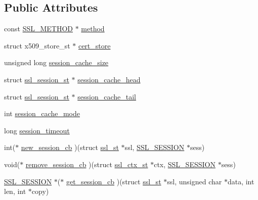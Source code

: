 \subsection*{Public Attributes}
\begin{DoxyCompactItemize}
\item 
const \hyperlink{ssl_8h_a74d54b9a714accac31c73bfb55973e81}{S\-S\-L\-\_\-\-M\-E\-T\-H\-O\-D} $\ast$ \hyperlink{structssl__ctx__st_a9e4773d3ec5b1a80abab92390015c576}{method}
\item 
struct x509\-\_\-store\-\_\-st $\ast$ \hyperlink{structssl__ctx__st_a8b6658b3bc3acb20908f2541056e3949}{cert\-\_\-store}
\item 
unsigned long \hyperlink{structssl__ctx__st_af715c6f8caa8c192423ad5abfa211e6e}{session\-\_\-cache\-\_\-size}
\item 
struct \hyperlink{structssl__session__st}{ssl\-\_\-session\-\_\-st} $\ast$ \hyperlink{structssl__ctx__st_a3683adb75792a407eee86f042a7c7c68}{session\-\_\-cache\-\_\-head}
\item 
struct \hyperlink{structssl__session__st}{ssl\-\_\-session\-\_\-st} $\ast$ \hyperlink{structssl__ctx__st_a1524f4319d24d011a575b8e9a70a0065}{session\-\_\-cache\-\_\-tail}
\item 
int \hyperlink{structssl__ctx__st_a957af083f0d87b4347e29788bd7e00e5}{session\-\_\-cache\-\_\-mode}
\item 
long \hyperlink{structssl__ctx__st_a7b165f0e9fbde0499dedb660cdf0d756}{session\-\_\-timeout}
\item 
int($\ast$ \hyperlink{structssl__ctx__st_ad25375ee230e8a9dafda44d9c9bcb102}{new\-\_\-session\-\_\-cb} )(struct \hyperlink{structssl__st}{ssl\-\_\-st} $\ast$ssl, \hyperlink{ssl_8h_a8dd6b81bbcb1b2d769235c37779d2a94}{S\-S\-L\-\_\-\-S\-E\-S\-S\-I\-O\-N} $\ast$sess)
\item 
void($\ast$ \hyperlink{structssl__ctx__st_a82fef836aeedd6eabb09c4443f8897de}{remove\-\_\-session\-\_\-cb} )(struct \hyperlink{structssl__ctx__st}{ssl\-\_\-ctx\-\_\-st} $\ast$ctx, \hyperlink{ssl_8h_a8dd6b81bbcb1b2d769235c37779d2a94}{S\-S\-L\-\_\-\-S\-E\-S\-S\-I\-O\-N} $\ast$sess)
\item 
\hyperlink{ssl_8h_a8dd6b81bbcb1b2d769235c37779d2a94}{S\-S\-L\-\_\-\-S\-E\-S\-S\-I\-O\-N} $\ast$($\ast$ \hyperlink{structssl__ctx__st_a5c21087395cba272416cde57785ba09b}{get\-\_\-session\-\_\-cb} )(struct \hyperlink{structssl__st}{ssl\-\_\-st} $\ast$ssl, unsigned char $\ast$data, int len, int $\ast$copy)
\item 
\begin{tabbing}

\end{tabbing}
\end{DoxyCompactItemize}
